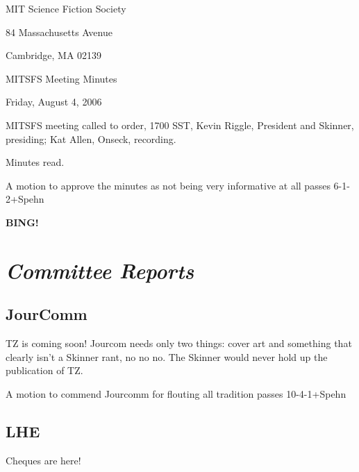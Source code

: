 \documentclass[10pt]{article}
\newcommand{\bing}{{\bf BING!} }
\newcommand{\goto}[1]{\bing \vskip 12pt \section*{{\em{#1}}}}
\begin{document}
\begin{center}

MIT Science Fiction Society

84 Massachusetts Avenue

Cambridge, MA 02139

\vspace{12pt}

MITSFS Meeting Minutes

Friday, August 4, 2006

\end{center}

\vspace{18pt}

\setlength{\parskip}{6pt}

\noindent
MITSFS meeting called to order, 1700 SST,
Kevin Riggle, President and Skinner, presiding; Kat Allen, Onseck, recording.

Minutes read.

A motion to approve the minutes as not being very informative at all
passes 6-1-2+Spehn

\goto{Committee Reports}




\subsection*{JourComm}
TZ is coming soon! Jourcom needs only two things: cover art and
something that clearly isn't a Skinner rant, no no no. The Skinner
would never hold up the publication of TZ.

A motion to commend Jourcomm for flouting all tradition passes 10-4-1+Spehn

\subsection*{LHE}
Cheques are here! 
\end{document}
